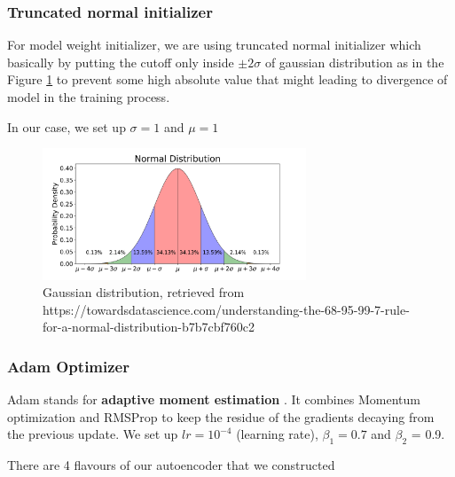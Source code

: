 \subsubsection*{Truncated normal initializer}
For model weight initializer, we are using truncated normal initializer which basically by putting the cutoff only inside $\pm2\sigma$ of gaussian distribution as in the Figure \ref{fig:normal_dist} to prevent some high absolute value that might leading to divergence of model in the training process.

In our case, we set up $\sigma=1$ and $\mu=1$ 
\begin{figure}[h!]
    \centering
    \includegraphics[width=0.7\textwidth]{images/normal_dist.png}
    \caption{Gaussian distribution, retrieved from https://towardsdatascience.com/understanding-the-68-95-99-7-rule-for-a-normal-distribution-b7b7cbf760c2}
    \label{fig:normal_dist}
\end{figure}

\subsubsection*{Adam Optimizer}
Adam stands for \textbf{adaptive moment estimation} \cite{adam}. It combines Momentum optimization and RMSProp to keep the residue of the gradients decaying from the previous update.
We set up $lr = 10^{-4}$ (learning rate), $\beta_1 = 0.7$ and $\beta_2$ = 0.9.
\vspace{0.4in}
\par There are 4 flavours of our autoencoder that we constructed

